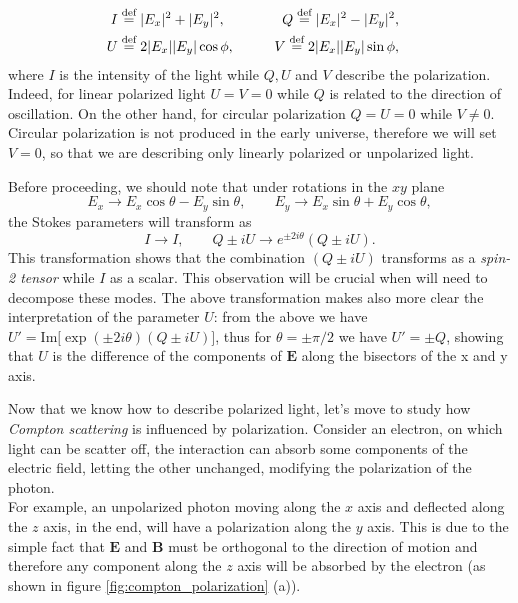 \begin{align}\label{eq:stokes_parameters}
    I&\stackrel{\text{def}}{=} |E_x|^2+|E_y|^2,\qquad &Q\stackrel{\text{def}}{=} |E_x|^2-|E_y|^2,&&\nonumber\\ U&\stackrel{\text{def}}{=} 2|E_x||E_y|\cos\phi,\qquad &V\stackrel{\text{def}}{=} 2|E_x||E_y|\sin\phi,&&
\end{align}
where $I$ is the intensity of the light while $Q,U$ and $V$ describe the polarization. Indeed, for linear polarized light $U=V=0$ while $Q$ is related to the direction of oscillation. On the other hand, for circular polarization $Q=U=0$ while $V\neq0$.\\Circular polarization is not produced in the early universe, therefore we will set $V=0$, so that we are describing only linearly polarized or unpolarized light.

Before proceeding, we should note that under rotations in the $xy$ plane $$E_x\rightarrow E_x\cos\theta-E_y\sin\theta,\qquad E_y\rightarrow E_x\sin\theta+E_y\cos\theta,$$ the  Stokes parameters will transform as
$$I\rightarrow I,\qquad Q\pm iU\rightarrow e^{\pm 2i\theta}(Q\pm iU).$$
This transformation shows that the combination $(Q\pm iU)$ transforms as a \emph{spin-2 tensor} while $I$ as a scalar. This observation will be crucial when will need to decompose these modes. The above transformation makes also more clear the interpretation of the parameter $U$: from the above we have $U'=\text{Im}\big[\exp(\pm2i\theta)(Q\pm iU)\big]$, thus for $\theta= \pm\pi/2$ we have $U'=\pm Q$, showing that $U$ is the difference of the components of $\mathbf{E}$ along the bisectors of the x and y axis.

Now that we know how to describe polarized light, let's move to study how \emph{Compton scattering} is influenced by polarization. Consider an electron, on which light can be scatter off, the interaction can absorb some components of the electric field, letting the other unchanged, modifying the polarization of the photon.\\
For example, an unpolarized photon moving along the $x$ axis and deflected along the $z$ axis, in the end, will have a polarization along the $y$ axis. This is due to the simple fact that $\mathbf{E}$ and $\mathbf{B}$ must be orthogonal to the direction of motion and therefore any component along the $z$ axis will be absorbed by the electron (as shown in figure \ref{fig:compton_polarization} (a)).

